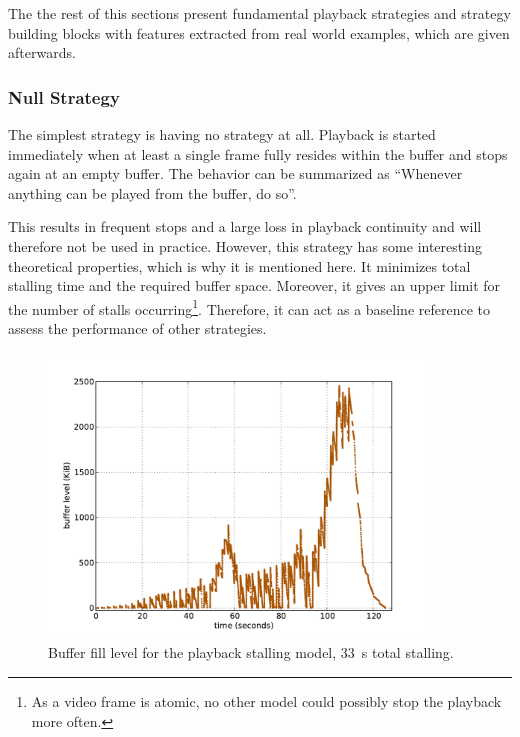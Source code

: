 The the rest of this sections present fundamental playback strategies and strategy building blocks with features extracted from real world examples, which are given afterwards. 



\subsubsection{Null Strategy}

The simplest strategy is having no strategy at all. Playback is started immediately when at least a single frame fully resides within the buffer and stops again at an empty buffer. The behavior can be summarized as ``Whenever anything can be played from the buffer, do so''.

This results in frequent stops and a large loss in playback continuity and will therefore not be used in practice. However, this strategy has some interesting theoretical properties, which is why it is mentioned here.
It minimizes total stalling time and the required buffer space. Moreover, it gives an upper limit for the number of stalls occurring\footnote{As a video frame is atomic, no other model could possibly stop the playback more often.}. Therefore, it can act as a baseline reference to assess the performance of other strategies.

\begin{figure}[htb]
    \centering
    \includegraphics[width=0.9\textwidth]{images/bufferlevel-stall-new.pdf}
    \caption{Buffer fill level for the playback stalling model, \SI{33}{\second} total stalling.}
    \label{c3:fig:bufferlevel-stall}
\end{figure}

